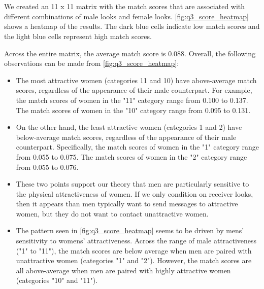 \section{}
We created an 11 x 11 matrix with the match scores that are associated with different combinations of male looks and female looks. \vref{fig:q3_score_heatmap} shows a heatmap of the results. The dark blue cells indicate low match scores and the light blue cells represent high match scores. 

Across the entire matrix, the average match score is 0.088. Overall, the following observations can be made from \cref{fig:q3_score_heatmap}:
\begin{itemize}
\item The most attractive women (categories 11 and 10) have above-average match scores, regardless of the appearance of their male counterpart. For example, the match scores of women in the "11" category range from 0.100 to 0.137. The match scores of women in the "10" category range from 0.095 to 0.131.

\item On the other hand, the least attractive women (categories 1 and 2) have below-average match scores, regardless of the appearance of their male counterpart. Specifically, the  match scores of women in the "1" category range from 0.055 to 0.075. The match scores of women in the "2" category range from 0.055 to 0.076.

\item These two points support our theory that men are particularly sensitive to the physical attractiveness of women. If we only condition on receiver looks, then it appears than men typically want to send messages to attractive women, but they do not want to contact unattractive women.

\item The pattern seen in \cref{fig:q3_score_heatmap} seems to be driven by mens' sensitivity to womens' attractiveness. Across the range of male attractiveness ("1" to "11"), the match scores are below average when men are paired with unattractive women (categories "1" and "2"). However, the match scores are all above-average when men are paired with highly attractive women (categories "10" and "11").   
\end{itemize}




